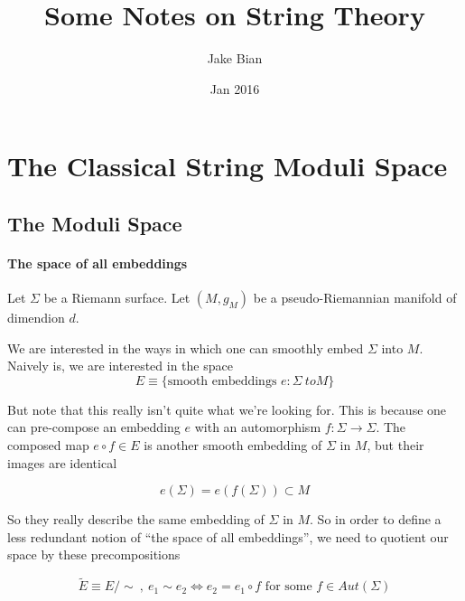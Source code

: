 \documentclass{article}
\title{Some Notes on String Theory}
\author{Jake Bian}
\date{Jan 2016}
\begin{document}
    \maketitle



    \section{The Classical String Moduli Space}

        \subsection{The Moduli Space}
        \paragraph{The space of all embeddings}

            Let $\Sigma$ be a Riemann surface. Let $(M, g_M)$ be a pseudo-Riemannian manifold of dimendion $d$.

            We are interested in the ways in which one can smoothly embed $\Sigma$ into $M$. Naively  is, we are interested in the space
            \begin{equation}
                E \equiv \{ \text{smooth embeddings } e: \Sigma \ to M \}
            \end{equation}

            But note that this really isn't quite what we're looking for. This is because one can pre-compose an embedding $e$ with an automorphism $f: \Sigma \to \Sigma$. The composed map $e \circ f \in E$ is another smooth embedding of $\Sigma$ in $M$, but their images are identical

            \begin{equation}
                e(\Sigma) = e(f(\Sigma)) \subset M
            \end{equation}

            So they really describe the same embedding of $\Sigma$ in $M$. So in order to define a less redundant notion of ``the space of all embeddings'', we need to quotient our space by these precompositions

            \begin{equation}
                \tilde E \equiv E/\sim ~,~ e_1 \sim e_2 \iff e_2 = e_1 \circ f \text{ for some } f \in Aut(\Sigma)
            \end{equation}
\end{document}
